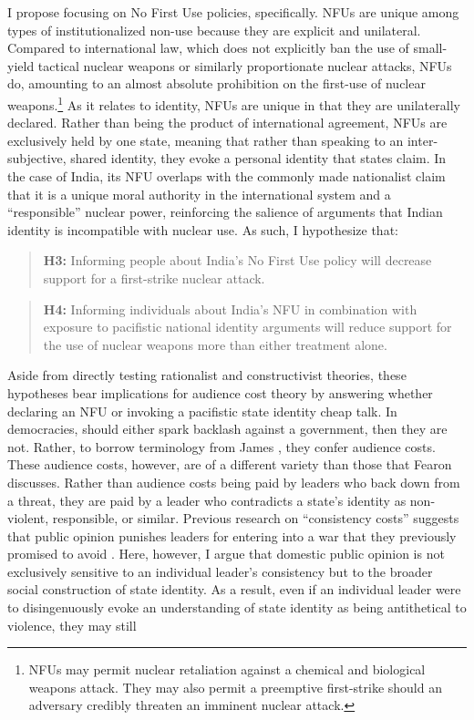 \documentclass[12pt]{article}
\begin{document}
I propose focusing on No First Use policies, specifically. NFUs are unique among types of institutionalized non-use because they are explicit and unilateral. Compared to international law, which does not explicitly ban the use of small-yield tactical nuclear weapons or similarly proportionate nuclear attacks, NFUs do, amounting to an almost absolute prohibition on the first-use of nuclear weapons.\footnote{ NFUs may permit nuclear retaliation against a chemical and biological weapons attack. They may also permit a preemptive first-strike should an adversary credibly threaten an imminent nuclear attack.} As it relates to identity, NFUs are unique in that they are unilaterally declared. Rather than being the product of international agreement, NFUs are exclusively held by one state, meaning that rather than speaking to an inter-subjective, shared identity, they evoke a personal identity that states claim. In the case of India, its NFU overlaps with the commonly made nationalist claim that it is a unique moral authority in the international system and a “responsible” nuclear power, reinforcing the salience of arguments that Indian identity is incompatible with nuclear use. As such, I hypothesize that:

\begin{quote}
\textbf{H3:} Informing people about India's No First Use policy will decrease support for a first-strike nuclear attack.
\end{quote}

\begin{quote}
\textbf{H4:} Informing individuals about India's NFU in combination with exposure to pacifistic national identity arguments will reduce support for the use of nuclear weapons more than either treatment alone.
\end{quote}

Aside from directly testing rationalist and constructivist theories, these hypotheses bear implications for audience cost theory by answering whether declaring an NFU or invoking a pacifistic state identity cheap talk. In democracies, should either spark backlash against a government, then they are not. Rather, to borrow terminology from James \citet{fearon_domestic_1994}, they confer audience costs. These audience costs, however, are of a different variety than those that Fearon discusses. Rather than audience costs being paid by leaders who back down from a threat, they are paid by a leader who contradicts a state's identity as non-violent, responsible, or similar. Previous research on “consistency costs” suggests that public opinion punishes leaders for entering into a war that they previously promised to avoid \citep{levy_backing_2015}. Here, however, I argue that domestic public opinion is not exclusively sensitive to an individual leader's consistency but to the broader social construction of state identity. As a result, even if an individual leader were to disingenuously evoke an understanding of state identity as being antithetical to violence, they may still 
\end{document}
